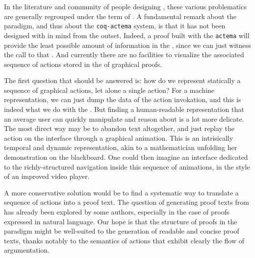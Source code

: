 In the literature and community of people designing , these
various problematics are generally regrouped under the term of . A fundamental remark about the  paradigm, and thus about the
\texttt{coq-actema} system, is that it has not been designed with  in mind from the outset. Indeed, a proof built with the
\texttt{actema}  will provide the least possible amount of information in
the , since we can just witness the call to that . And
currently there are no facilities to visualize the associated sequence of
actions stored in the  of graphical proofs.

The first question that should be answered is: how do we represent statically a
sequence of graphical actions, let alone a single action? For a machine
representation, we can just dump the data of the action invokation, and this is
indeed what we do with the . But finding a human-readable
representation that an average user can quickly manipulate and reason about is a
lot more delicate. The most direct way may be to abandon text altogether, and
just replay the action on the interface through a graphical animation. This is
an intrisically temporal and dynamic representation, akin to a mathematician
unfolding her demonstration on the blackboard. One could then imagine an
interface dedicated to the richly-structured navigation inside this sequence of
animations, in the style of an improved video player.

A more conservative solution would be to find a systematic way to translate a
sequence of actions into a proof text. The question of generating 
proof texts from   has already been explored by some
authors, especially in the case of proofs expressed in natural
language. Our hope is that the structure of proofs
in the  paradigm might be well-suited to the generation of
readable and concise proof texts, thanks notably to the 
semantics of  actions that exhibit clearly the flow of argumentation.

